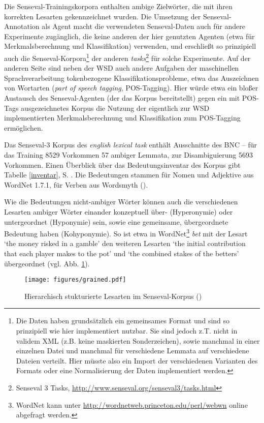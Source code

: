 \documentclass[abstracton, 12pt]{scrartcl}
\begin{document}
Die Senseval-Trainingskorpora enthalten ambige Zielwörter, die mit ihren korrekten Lesarten gekennzeichnet wurden. Die Umsetzung der Senseval-Annotation als Agent macht die verwendeten Senseval-Daten auch für andere Experimente zugänglich, die keine anderen der hier genutzten Agenten (etwa für Merkmalsberechnung und Klassifikation) verwenden, und erschließt so prinzipiell auch die Senseval-Korpora\footnote{Die Daten haben grundsätzlich ein gemeinsames Format und sind so prinzipiell wie hier implementiert nutzbar. Sie sind jedoch z.T. nicht in validem XML (z.B. keine maskierten Sonderzeichen), sowie manchmal in einer einzelnen Datei und manchmal für verschiedene Lemmata auf verschiedene Dateien verteilt. Hier müsste also ein Import der verschiedenen Varianten des Formats oder eine Normalisierung der Daten implementiert werden.} der anderen \emph{tasks}\footnote{Senseval 3 Tasks, \url{http://www.senseval.org/senseval3/tasks.html}} für solche Experimente. Auf der anderen Seite sind neben der WSD auch andere Aufgaben der maschinellen Sprachverarbeitung tokenbezogene Klassifikationsprobleme, etwa das Auszeichnen von Wortarten (\emph{part of speech tagging}, POS-Tagging). Hier würde etwa ein bloßer Austausch des Senseval-Agenten (der das Korpus bereitstellt) gegen ein mit POS-Tags ausgezeichnetes Korpus die Nutzung der eigentlich zur WSD implementierten Merkmalsberechnung und  Klassifikation zum POS-Tagging ermöglichen.

Das Senseval-3 Korpus des \emph{english lexical task} enthält Ausschnitte des BNC -- für das Training 8529 Vorkommen 57 ambiger Lemmata, zur Disambiguierung 5693 Vorkommen. Einen Überblick über das Bedeutungsinventar des Korpus gibt Tabelle \ref{inventar}, S. \pageref{inventar}. Die Bedeutungen stammen für Nomen und Adjektive aus WordNet 1.7.1, für Verben aus Wordsmyth (\citealt{MihalceaEtAl2004}).

Wie die Bedeutungen nicht-ambiger Wörter können auch die verschiedenen Lesarten ambiger Wörter einander konzeptuell über- (Hyperonymie) oder untergeordnet (Hyponymie) sein, sowie eine gemeinsame, übergeordnete Bedeutung haben (Kohyponymie). So ist etwa in WordNet\footnote{WordNet kann unter \url{http://wordnetweb.princeton.edu/perl/webwn} online abgefragt werden.} \emph{bet} mit der Lesart `the money risked in a gamble' den weiteren Lesarten `the initial contribution that each player makes to the pot' und `the combined stakes of the betters' übergeordnet (vgl. Abb. \ref{grained}).

\begin{figure}
    \begin{center}
 \texttt{[image: figures/grained.pdf]}
\caption[Hierarchisch stukturierte Lesarten im Senseval-Korpus]{Hierarchisch stukturierte Lesarten im Senseval-Korpus (\citealt[79]{PalmerEtAl2006})}
\label{grained}
    \end{center}
   \end{figure} 
\end{document}
